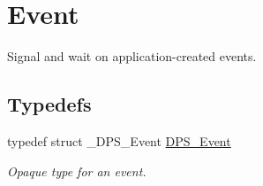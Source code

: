 \hypertarget{group__event}{}\section{Event}
\label{group__event}


Signal and wait on application-\/created events.  


\subsection*{Typedefs}
\begin{DoxyCompactItemize}
\item 
\mbox{\label{group__event_ga97617da1bac0e76646713b8665dfdd85}} 
typedef struct \+\_\+\+D\+P\+S\+\_\+\+Event \hyperlink{group__event_ga97617da1bac0e76646713b8665dfdd85}{D\+P\+S\+\_\+\+Event}
\begin{DoxyCompactList}\small\item\em Opaque type for an event. \end{DoxyCompactList}\end{DoxyCompactItemize}
